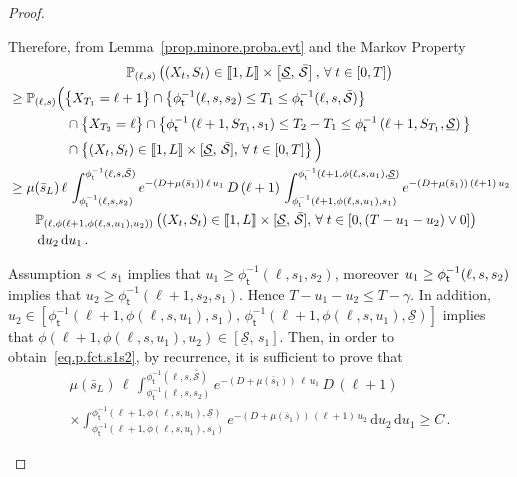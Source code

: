 \documentclass[AHL,Unicode,longabstracts,published]{cedram}
\newcommand{\llbracket}{\mathopen{[\mkern -2.7mu[}}
\newcommand{\rrbracket}{\mathclose{]\mkern -2.7mu]}}
\newcommand{\PP}{\mathbb{P}}
\newcommand{\dif}{\mathrm{d}}
\newcommand{\Smin}{\underline{\mathcal{S}}}
\newcommand{\Smax}{\bar{\mathcal{S}}}
\newcommand{\barmu}{\mu(\bar s_1)}
\newcommand{\phit}{\phi_\textsf{t}^{-1}}
\newcommand{\setunL}{\llbracket 1, L\rrbracket}
\newcommand{\1}{\mathbf{1}}
\let\oldforall\forall
\renewcommand*{\forall}{\mathrel{\oldforall}}
\begin{document}
\begin{proof}
\begin{itemize}
Therefore, from Lemma~\ref{prop.minore.proba.evt} and the Markov Property
\begin{multline}\label{expression.k_plus_un}
\PP_{(\ell,s)}
\left(\left(X_t,S_t\right) \in \setunL \times \left[\Smin, \, \Smax\right], \,
\forall t\in[0,T]\right)
\\
\begin{aligned}
& \geq
\PP_{(\ell,s)}
\Big(\big\{X_{T_{1}}=\ell+1\big\}\cap \big\{\phit(\ell,s,s_2)\leq T_1\leq \phit(\ell,s,\Smax) \big\}
\\
&\qquad\qquad\;
\cap \big\{X_{T_{2}}=\ell\big\}\cap \big\{\phit\left(\ell+1,S_{T_1},s_1\right)\leq T_2-T_1\leq \phit\left(\ell+1,S_{T_1},\Smin\right)\big\}
\\
&\qquad\qquad\;
\cap \left\{(X_t,S_t) \in \setunL \times [\Smin, \, \Smax], \,
\forall t\in[0,T]\right\}\Big)
\\
&\geq
\mu(\bar s_L) \,\ell\,
\int_{\phit(\ell,s,s_2)}^{\phit(\ell,s,\Smax)} e^{-(D+\barmu)\,\ell\,u_1} \, D\,(\ell+1)\,
\int_{\phit\left(\ell+1,\phi(\ell,s,u_1),s_1\right)}^{\phit\left(\ell+1,\phi(\ell,s,u_1),\Smin\right)} e^{-(D+\barmu)\,(\ell+1)\,u_2}
\\
& \qquad
\PP_{\left(\ell,\phi(\ell+1,\phi(\ell,s,u_1),u_2)\right)}
\left((X_t,S_t) \in \setunL \times [\Smin, \, \Smax], \,
\forall t\in[0,(T-u_1-u_2)\vee 0]\right)
\\
& \qquad
\,\dif u_2\,\dif u_1\,.
\end{aligned}
\end{multline}

Assumption $s<s_1$ implies that $u_1\geq \phit(\ell,s_1, s_2)$, moreover $u_1\geq \phit(\ell,s,\linebreak s_2)$ implies that $u_2 \geq \phit(\ell+1,s_2,s_1)$. Hence $T-u_1-u_2 \leq T-\gamma$. In addition, $u_2\in [\phit(\ell+1,\phi(\ell,s,u_1),s_1),\, \phit(\ell+1,\phi(\ell,s,u_1),\Smin)]$ implies that $\phi(\ell+1,\phi(\ell,s,u_1),u_2)\in[\Smin,\,s_1]$. Then, in order to obtain~\eqref{eq.p.fct.s1s2}, by recurrence, it is sufficient to prove that
\begin{multline}\label{proba.minoree.C}
\mu(\bar s_L) \,\ell\,
\int_{\phit(\ell,s,s_2)}^{\phit(\ell,s,\Smax)} e^{-(D+\barmu)\,\ell\,u_1} \, D\,(\ell+1)\,\\
\times
\int_{\phit\left(\ell+1,\phi(\ell,s,u_1),s_1\right)}^{\phit\left(\ell+1,\phi(\ell,s,u_1),\Smin\right)} e^{-(D+\barmu)\,(\ell+1)\,u_2}\,\dif u_2\,\dif u_1
\geq C\,.
\end{multline}


\end{itemize}
\end{proof}
\end{document}
